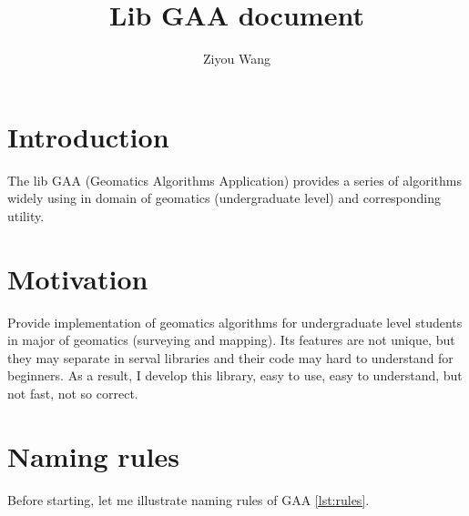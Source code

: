 \documentclass[9pt,a4paper,onecolumn,oneside]{rho-class/rho}
\title{Lib GAA document}
\author{Ziyou Wang}
\begin{document}
\maketitle
\tableofcontents
\thispagestyle{firststyle}


\section{Introduction}

The lib GAA (Geomatics Algorithms Application) provides a series of algorithms widely using in domain of geomatics (undergraduate level) and corresponding utility.

\section{Motivation}

Provide implementation of geomatics algorithms for undergraduate level students in major of geomatics (surveying and mapping). Its features are not unique, but they may separate in serval libraries and their code may hard to understand for beginners. As a result, I develop this library, easy to use, easy to understand, but not fast, not so correct.

\section{Naming rules}
Before starting, let me illustrate naming rules of GAA \ref{lst:rules}.
\end{document}
